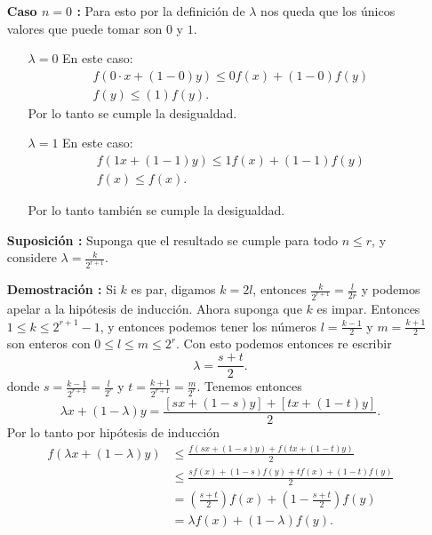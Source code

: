 \documentclass{report}
\begin{document}
\begin{enumerate}
  \item[\textbf{Caso $n = 0$ :}] Para esto por la definición de $\lambda$ nos queda que los únicos valores que puede tomar son  $0$ y $1$.
    \begin{enumerate}
      \item[$\lambda = 0$] En este caso:
	\begin{align*}
	  f\left( 0\cdot x + \left( 1 - 0 \right) y \right) \le 0 f\left( x \right) + \left( 1 - 0 \right) f\left( y \right) \\
	  f\left( y \right) \le \left( 1 \right) f\left( y \right) 
	.\end{align*}
	Por lo tanto se cumple la desigualdad.
      \item[$\lambda = 1$ ] En este caso:
	\begin{align*}
	  f\left( 1 x + \left( 1 - 1 \right) y \right) \le 1 f\left( x \right) + \left( 1 - 1 \right) f\left( y \right) \\
	  f\left( x \right) \le f\left( x \right) 
	.\end{align*}

	Por lo tanto también se cumple la desigualdad.
    \end{enumerate}

  \item[\textbf{Suposición :}] Suponga que el resultado se cumple para todo $n \le r$, y considere $\lambda = \frac{k}{2^{r + 1}}$.
  \item[\textbf{Demostración :}] Si $k$ es par, digamos $k = 2l$, entonces $\frac{k}{2^{r+1}} = \frac{l}{2r}$ y podemos apelar a la hipótesis de inducción. Ahora suponga que $k$ es impar. Entonces $1 \le k \le 2^{r + 1} - 1$, y entonces podemos tener los números $l = \frac{k-1}{2}$ y $m = \frac{k + 1}{2}$ son enteros con $0 \le l \le m \le 2^{r}$. Con esto podemos entonces re escribir \[
  \lambda = \frac{s + t}{2}
  .\] donde $s = \frac{k - 1}{2^{r + 1}} = \frac{l}{2^{r}}$ y $t = \frac{k + 1}{2^{r + 1}} = \frac{m}{2^{r}}$. Tenemos entonces \[
  \lambda x + \left( 1 - \lambda \right) y = \frac{\left[ sx + \left( 1 - s \right) y \right] + \left[ tx + \left( 1 - t \right) y \right] }{2}
  .\]  Por lo tanto por hipótesis de inducción 
  \begin{align*}
    f\left( \lambda x + \left( 1 - \lambda \right) y \right) &\le \frac{f\left( sx + \left( 1 - s \right) y \right) + f\left( tx + \left( 1 - t \right) y \right) }{2} \\
							     &\le \frac{sf\left( x \right) + \left( 1 - s \right) f\left( y \right) + tf\left( x \right) + \left( 1 - t \right) f\left( y \right) }{2}\\
							     &= \left( \frac{s + t}{2} \right) f\left( x \right)  + \left( 1 - \frac{s + t}{2} \right) f\left( y \right) \\
							     &= \lambda f\left( x \right) + \left( 1 - \lambda \right) f\left( y \right) 
  .\end{align*}


\end{enumerate}
\end{document}
